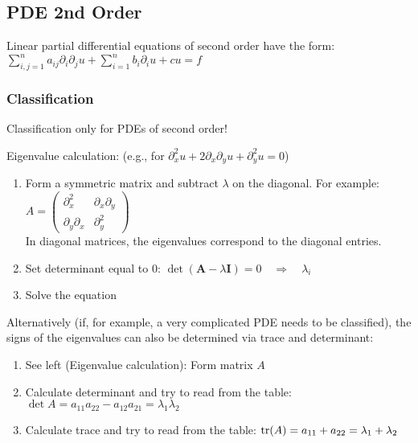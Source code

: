 
\subsection{PDE 2nd Order}
Linear partial differential equations of second order have the form:
$\boxed{\sum\limits_{i,j=1}^{n}{a_{ij}\partial_i\partial_j u}+\sum\limits_{i=1}^{n}{b_i\partial_i u}+cu=f}$

\subsubsection{Classification}
Classification only for PDEs of second order!

\begin{minipage}{9cm}
  Eigenvalue calculation: (e.g., for $ \partial^2_xu+2\partial_x\partial_yu+\partial^2_yu=0 $)
  \begin{enumerate}
    \item Form a symmetric matrix and subtract $\lambda$ on the diagonal. For example: $A = \begin{pmatrix}
      \partial_x^2 & \partial_x \partial_y \\
      \partial_y \partial_x  & \partial_y^2
    \end{pmatrix}$\\
    In diagonal matrices, the eigenvalues correspond to the diagonal entries.
    \item Set determinant equal to 0: $\det(\mathbf{A}-\lambda \mathbf{I}) = 0\quad\Rightarrow\quad \lambda_i$
    \item Solve the equation
  \end{enumerate}
\end{minipage}
\hfill
\begin{minipage}{9cm}
  Alternatively (if, for example, a very complicated PDE needs to be classified), the signs of the eigenvalues can also be determined via trace and determinant:
  \begin{enumerate}
    \item See left (Eigenvalue calculation): Form matrix $A$
    \item Calculate determinant and try to read from the table:
     $\det A = a_{11}a_{22} - a_{12}a_{21} = \lambda_1 \lambda_2$
    \item Calculate trace and try to read from the table:
      $\operatorname{tr}(A) = a_{11} + a_{22} = \lambda_1 + \lambda_2$
  \end{enumerate}
\end{minipage}


